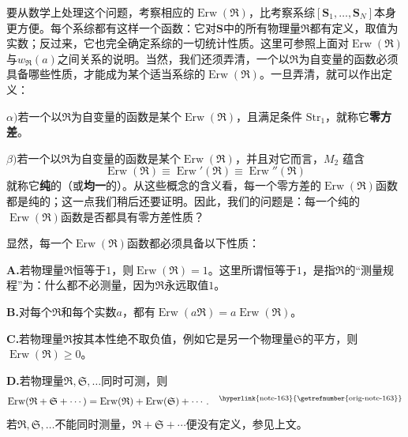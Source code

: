 \documentclass[fontsize=13pt,twoside,openany,headings=normal,parskip=false,bookmarkpackage=false,DIV=calc]{scrbook}
\begin{document}
要从数学上处理这个问题，考察相应的$\operatorname{Erw}(\mathfrak R)$，比考察系综$[\boldsymbol{S}_1,\allowbreak \ldots,\allowbreak \boldsymbol{S}_N]$本身更方便。每个系综都有这样一个函数：它对$\boldsymbol{S}$中的所有物理量$\mathfrak R$都有定义，取值为实数；反过来，它也完全确定系综的一切统计性质。这里可参照上面对$\operatorname{Erw}(\mathfrak R)$与$w_{\mathfrak R}(a)$之间关系的说明。当然，我们还须弄清，一个以$\mathfrak R$为自变量的函数必须具备哪些性质，才能成为某个适当系综的$\operatorname{Erw}(\mathfrak R)$。一旦弄清，就可以作出定义：

\noindent{}$\alpha)$\label{def:IV.1.alpha}若一个以$\mathfrak R$为自变量的函数是某个$\operatorname{Erw}(\mathfrak R)$，且满足条件 \hyperref[eq:IV.1.Str1]{$\mathrm{Str}_1$}，就称它\textbf{零方差}。

\noindent{}$\beta)$\label{def:IV.1.beta}若一个以$\mathfrak R$为自变量的函数是某个$\operatorname{Erw}(\mathfrak R)$，并且对它而言，\hyperref[eq:IV.1.M2]{$M_2$} 蕴含
\[
\operatorname{Erw}(\mathfrak R)\equiv\operatorname{Erw}'(\mathfrak R)
\equiv\operatorname{Erw}''(\mathfrak R)
\]
就称它\textbf{纯}的（或\textbf{均一}的）。从这些概念的含义看，每一个零方差的$\operatorname{Erw}(\mathfrak R)$函数都是纯的；这一点我们稍后还要证明。因此，我们的问题是：每一个纯的$\operatorname{Erw}(\mathfrak R)$函数是否都具有零方差性质？

显然，每一个$\operatorname{Erw}(\mathfrak R)$函数都必须具备以下性质：

\noindent{}\textbf{A.}\label{cond:IV.1.A}若物理量$\mathfrak R$恒等于$1$，则$\operatorname{Erw}(\mathfrak R)=1$。这里所谓恒等于$1$，是指$\mathfrak R$的“测量规程”为：什么都不必测量，因为$\mathfrak R$永远取值$1$。

\noindent{}\textbf{B.}\label{cond:IV.1.B}对每个$\mathfrak R$和每个实数$a$，都有$\operatorname{Erw}(a\mathfrak R)=a\operatorname{Erw}(\mathfrak R)$。

\hypertarget{origpage-164}{}\label{origpage-164}\noindent{}\textbf{C.}\label{cond:IV.1.C}若物理量$\mathfrak R$按其本性绝不取负值，例如它是另一个物理量$\mathfrak S$的平方，则$\operatorname{Erw}(\mathfrak R)\geq0$。

\noindent{}\textbf{D.}\label{cond:IV.1.D}若物理量$\mathfrak R,\allowbreak \mathfrak S,\allowbreak \ldots$同时可测，则
\[
\operatorname{Erw}(\mathfrak R+\mathfrak S+\cdots)=\operatorname{Erw}(\mathfrak R)+\operatorname{Erw}(\mathfrak S)+\cdots.
\quad\text{\textsuperscript{\hyperlink{note-163}{\getrefnumber{orig-note-163}}}}
\]
若$\mathfrak R,\allowbreak \mathfrak S,\allowbreak \ldots$不能同时测量，$\mathfrak R+\mathfrak S+\cdots$便没有定义，参见上文。
\end{document}
